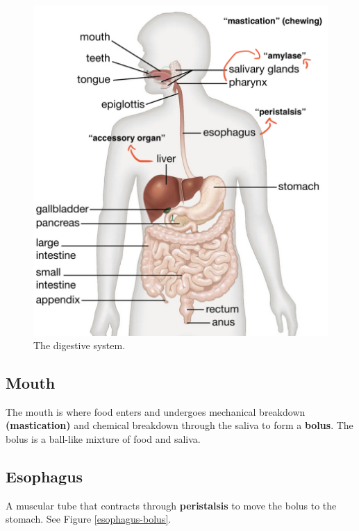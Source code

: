 \documentclass[12pt]{report}
\begin{document}
\begin{figure}[H]
\centering
    \includegraphics[width=\textwidth]{../figures/digestive system}
    \caption{The digestive system.}
    \label{fig:digestive-system}
\end{figure}

\subsection{Mouth}
\begin{definition}[Mouth]
    The mouth is where food enters and undergoes mechanical breakdown \textbf{(mastication)} and chemical breakdown through the saliva to form a \textbf{bolus}. The bolus is a ball-like mixture of food and saliva.
\end{definition}

\subsection{Esophagus}
\begin{definition}[Esophagus]
    A muscular tube that contracts through \textbf{peristalsis} to move the bolus to the stomach. See Figure \ref{esophagus-bolus}.
\end{definition}
\end{document}
